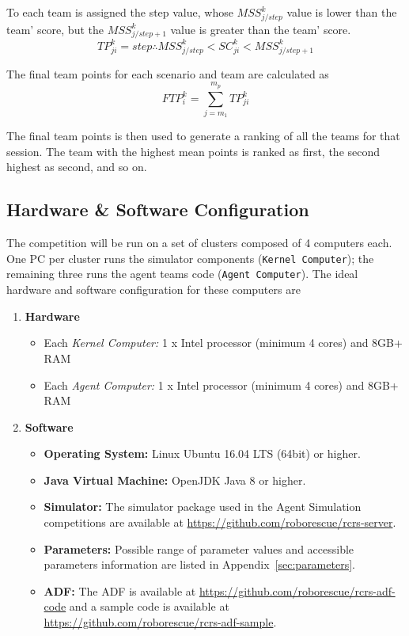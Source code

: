 \documentclass{article}
\begin{document}
To each team is assigned the step value, whose $MSS_{j/step}^{k}$ value is lower than the team' score, but the $MSS_{j/step+1}^{k}$ value is greater than the team' score.
\begin{equation}
TP_{ji}^{k} = step \therefore MSS_{j/step}^{k} < SC_{ji}^{k} < MSS_{j/step+1}^{k}
\end{equation}

The final team points for each scenario and team are calculated as
\begin{equation}
FTP_{i}^{k} = \sum_{j=m_{1}}^{m_{p}}{TP_{ji}^{k}}
\end{equation}

The final team points is then used to generate a ranking of all the teams for that session. The team with the highest mean points is ranked as first, the second highest as second, and so on.
\subsection{Hardware \& Software Configuration}
The competition will be run on a set of clusters composed of 4 computers each. One PC per cluster runs the simulator components (\texttt{Kernel Computer}); the remaining three runs the agent teams code (\texttt{Agent Computer}). The ideal hardware and software configuration for these computers are
\begin{enumerate}[ ]
  \item \textbf{Hardware}
  \begin{itemize}[ ]
    \item Each \emph{Kernel Computer:} 1 x Intel processor (minimum 4 cores) and 8GB+ RAM
    \item Each \emph{Agent Computer:} 1 x Intel processor (minimum 4 cores) and 8GB+ RAM
  \end{itemize}
  \item \textbf{Software}
  \begin{itemize}[ ]
    \item \textbf{Operating System:} Linux Ubuntu 16.04 LTS (64bit) or higher.
    \item \textbf{Java Virtual Machine:} OpenJDK Java 8 or higher.
    \item \textbf{Simulator:} The simulator package used in the Agent Simulation competitions are available at \url{https://github.com/roborescue/rcrs-server}.
    \item \textbf{Parameters:} Possible range of parameter values and accessible parameters information are listed in Appendix~\ref{sec:parameters}.
    \item \textbf{ADF:} The ADF is available at \url{https://github.com/roborescue/rcrs-adf-code} and a sample code is available at \url{https://github.com/roborescue/rcrs-adf-sample}.
  \end{itemize}
\end{enumerate}
\end{document}
